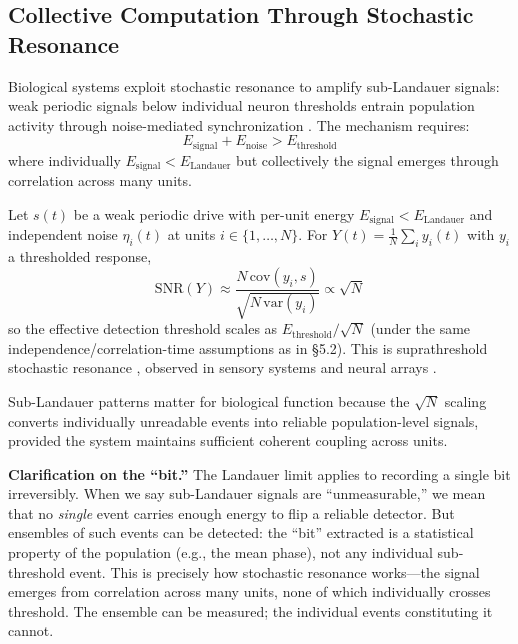 \documentclass[12pt]{article}
\begin{document}
\subsection{Collective Computation Through Stochastic Resonance}

Biological systems exploit stochastic resonance to amplify sub-Landauer signals: weak periodic signals below individual neuron thresholds entrain population activity through noise-mediated synchronization \cite{mcdonnell2011,gammaitoni1998}. The mechanism requires:
\begin{equation}
E_{\text{signal}} + E_{\text{noise}} > E_{\text{threshold}}
\end{equation}
where individually $E_{\text{signal}} < E_{\text{Landauer}}$ but collectively the signal emerges through correlation across many units.

Let $s(t)$ be a weak periodic drive with per-unit energy $E_{\text{signal}}<E_{\text{Landauer}}$ and independent noise $\eta_i(t)$ at units $i\in\{1,\dots,N\}$. For $Y(t)=\frac{1}{N}\sum_i y_i(t)$ with $y_i$ a thresholded response,
\begin{equation}
\mathrm{SNR}(Y)\approx \frac{N\,\mathrm{cov}(y_i,s)}{\sqrt{N\,\mathrm{var}(y_i)}}\propto \sqrt{N}
\end{equation}
so the effective detection threshold scales as $E_{\text{threshold}}/\sqrt{N}$ (under the same independence/correlation-time assumptions as in \S5.2). This is suprathreshold stochastic resonance \cite{stocks2000}, observed in sensory systems and neural arrays \cite{jaramillo1998,patel2011}.

Sub-Landauer patterns matter for biological function because the $\sqrt{N}$ scaling converts individually unreadable events into reliable population-level signals, provided the system maintains sufficient coherent coupling across units.

\textbf{Clarification on the ``bit.''} The Landauer limit applies to recording a single bit irreversibly. When we say sub-Landauer signals are ``unmeasurable,'' we mean that no \emph{single} event carries enough energy to flip a reliable detector. But ensembles of such events can be detected: the ``bit'' extracted is a statistical property of the population (e.g., the mean phase), not any individual sub-threshold event. This is precisely how stochastic resonance works---the signal emerges from correlation across many units, none of which individually crosses threshold. The ensemble can be measured; the individual events constituting it cannot.
\end{document}
